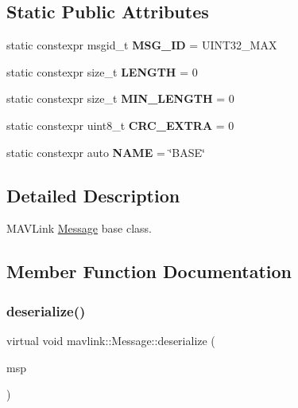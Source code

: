 \subsection*{Static Public Attributes}
\begin{DoxyCompactItemize}
\item 
\mbox{\label{structmavlink_1_1Message_a7f0f3c243218c213c80b88967607630e}} 
static constexpr msgid\+\_\+t {\bfseries M\+S\+G\+\_\+\+ID} = U\+I\+N\+T32\+\_\+\+M\+AX
\item 
\mbox{\label{structmavlink_1_1Message_a5bf17835d1732e0b83212a853a838c6b}} 
static constexpr size\+\_\+t {\bfseries L\+E\+N\+G\+TH} = 0
\item 
\mbox{\label{structmavlink_1_1Message_ae5e5cad97fc4b3e648c0a05f504d8770}} 
static constexpr size\+\_\+t {\bfseries M\+I\+N\+\_\+\+L\+E\+N\+G\+TH} = 0
\item 
\mbox{\label{structmavlink_1_1Message_ad261058b3a7dc68e69cd631e5cd766a2}} 
static constexpr uint8\+\_\+t {\bfseries C\+R\+C\+\_\+\+E\+X\+T\+RA} = 0
\item 
\mbox{\label{structmavlink_1_1Message_a8c65d1ee019780792fa21e2502b5306b}} 
static constexpr auto {\bfseries N\+A\+ME} = \char`\"{}B\+A\+SE\char`\"{}
\end{DoxyCompactItemize}


\subsection{Detailed Description}
M\+A\+V\+Link \hyperlink{structmavlink_1_1Message}{Message} base class. 

\subsection{Member Function Documentation}
\mbox{\label{structmavlink_1_1Message_a082824377e57f4e90bce4cba1a44f90b}} 
\subsubsection{\texorpdfstring{deserialize()}{deserialize()}}
{\footnotesize\ttfamily virtual void mavlink\+::\+Message\+::deserialize (\begin{DoxyParamCaption}\item[{\hyperlink{classmavlink_1_1MsgMap}{Msg\+Map} \&}]{msp }\end{DoxyParamCaption})\hspace{0.3cm}{\ttfamily [pure virtual]}}

